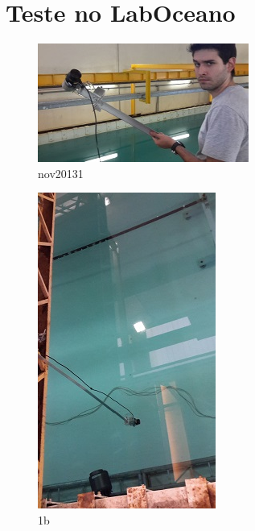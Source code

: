 \section{Teste no LabOceano}

\begin{figure}[h!]
\centering
  \includegraphics[width=1\linewidth]{Fotos/TesteLabOceanico/1.jpg}
  \caption{nov20131}
  \label{nov20131}
\end{figure}

\begin{figure}[h!]
  \centering
  \includegraphics[width=1\linewidth]{Fotos/TesteLabOceanico/2.jpg}
  \caption{1b}
  \label{nov20132}
\end{figure}